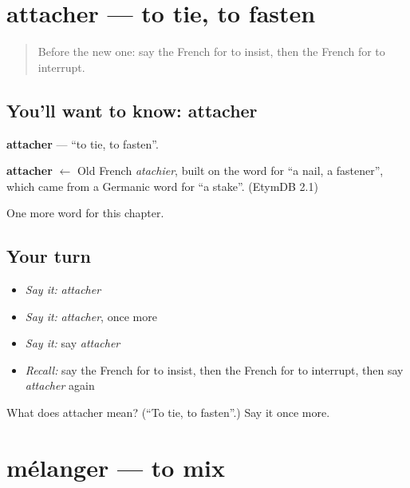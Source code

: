 \section[attacher]{attacher — to tie, to fasten}

\label{lesson:FR-C240-attacher}



\begin{quote}
Before the new one: say the French for to insist, then the French for to interrupt.
\end{quote}

\subsection*{You'll want to know: attacher}
\textbf{attacher} — \textquotedblleft{}to tie, to fasten\textquotedblright{}.

\begin{cousinweb}
\textbf{attacher} $\leftarrow$ Old French \emph{atachier}, built on the word for \textquotedblleft{}a nail, a fastener\textquotedblright{}, which came from a Germanic word for \textquotedblleft{}a stake\textquotedblright{}. (EtymDB 2.1)
\end{cousinweb}

\begin{grammarlens}[title={What you've built}]
One more word for this chapter.
\end{grammarlens}

\subsection*{Your turn}
\begin{itemize}
\raggedright
  \item \emph{Say it:} \emph{attacher}
  \item \emph{Say it:} \emph{attacher}, once more
  \item \emph{Say it:} say \emph{attacher}
  \item \emph{Recall:} say the French for to insist, then the French for to interrupt, then say \emph{attacher} again
\end{itemize}

\begin{tcolorbox}[breakable,colback=teal!4,colframe=teal!35!black,title={Before you move on}]
What does attacher mean? (\textquotedblleft{}To tie, to fasten\textquotedblright{}.) Say it once more.
\end{tcolorbox}
\section[mélanger]{mélanger — to mix}

